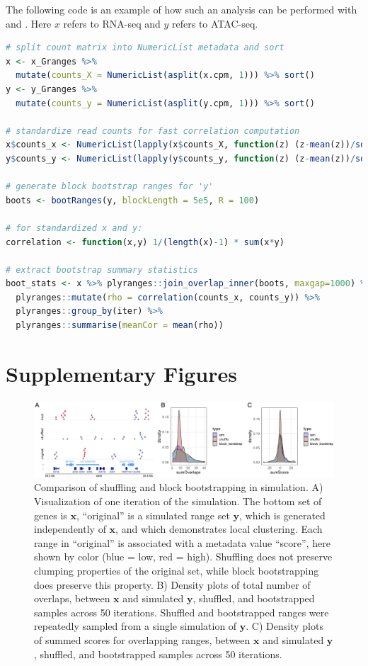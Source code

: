 \documentclass{article}
\begin{document}
The following code is an example of how such an analysis can be
performed with \bootranges and \plyranges. Here $x$ refers to RNA-seq and $y$ refers to ATAC-seq.

\begin{lstlisting}[language=R]
# split count matrix into NumericList metadata and sort
x <- x_Granges %>%
  mutate(counts_X = NumericList(asplit(x.cpm, 1))) %>% sort()
y <- y_Granges %>%
  mutate(counts_y = NumericList(asplit(y.cpm, 1))) %>% sort()

# standardize read counts for fast correlation computation
x$counts_x <- NumericList(lapply(x$counts_X, function(z) (z-mean(z))/sd(z)))
y$counts_y <- NumericList(lapply(y$counts_y, function(z) (z-mean(z))/sd(z)))

# generate block bootstrap ranges for 'y'
boots <- bootRanges(y, blockLength = 5e5, R = 100)

# for standardized x and y:
correlation <- function(x,y) 1/(length(x)-1) * sum(x*y)

# extract bootstrap summary statistics
boot_stats <- x %>% plyranges::join_overlap_inner(boots, maxgap=1000) %>%
  plyranges::mutate(rho = correlation(counts_x, counts_y)) %>%
  plyranges::group_by(iter) %>%
  plyranges::summarise(meanCor = mean(rho)) 
\end{lstlisting} 
 
\newpage

\section{Supplementary Figures}

\begin{figure}[htbp]
\centering
\includegraphics[scale=0.2]{Figures/simulation.jpg}
\caption{Comparison of shuffling and block bootstrapping in
    simulation. A) Visualization of one iteration of the simulation. The
    bottom set of genes is $\bm{x}$, ``original'' is a simulated
    range set $\bm{y}$, which is generated independently of
    $\bm{x}$, and which demonstrates local clustering.
    Each range in ``original'' is associated with a metadata
    value ``score'', here shown by color (blue = low, red = high).
    Shuffling does not preserve clumping properties of the original
    set, while block bootstrapping does preserve this property.
    B) Density plots of total number of overlaps, between
    $\bm{x}$ and simulated $\bm{y}$, shuffled, and bootstrapped
    samples across 50 iterations. Shuffled and bootstrapped ranges
    were repeatedly sampled from a single simulation of $\bm{y}$.
    C) Density plots of summed scores for overlapping ranges,
    between $\bm{x}$ and simulated $\bm{y}$, shuffled, and
    bootstrapped samples across 50 iterations.
}
\label{fig:simulation}
\end{figure}
\end{document}
